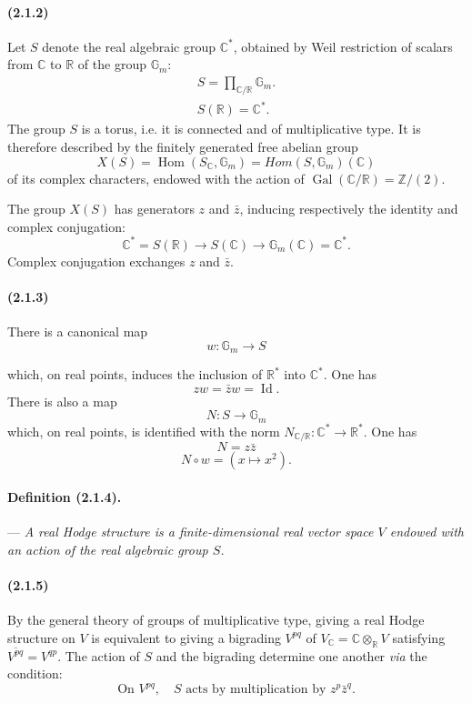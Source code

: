 \documentclass[10pt]{article}
\newcommand{\C}{\mathbb C}
\newcommand{\Z}{\mathbb Z}
\newcommand{\Hom}{\operatorname{Hom}}
\newcommand{\R}{\mathbb R}
\newcommand{\Gm}{\mathbb G_m}
\newcommand{\Gal}{\operatorname{Gal}}
\begin{document}
\paragraph{(2.1.2)} Let $S$ denote the real algebraic group $\C^*$, obtained by Weil restriction of scalars from $\C$ to $\R$ of the group $\Gm$:
\[
\begin{gathered}
S=\prod_{\C/\R}\Gm.\\
S(\R)=\C^*.
\end{gathered}
\]
The group $S$ is a torus, i.e. it is connected and of multiplicative type. It is therefore described by the finitely generated free abelian group
\[
X(S)=\Hom(S_\C,\Gm)=\mathit{Hom}(S,\Gm)(\C)
\]
of its complex characters, endowed with the action of $\Gal(\C/\R)=\Z/(2)$.

The group $X(S)$ has generators $z$ and $\bar z$, inducing respectively the identity and complex conjugation:
\[
\C^*=S(\R)\longrightarrow S(\C)\longrightarrow \Gm(\C)=\C^*.
\]
Complex conjugation exchanges $z$ and $\bar z$.

\paragraph{(2.1.3)} There is a canonical map
\[
\tag{2.1.3.1}
w:\Gm\longrightarrow S
\]




which, on real points, induces the inclusion of $\R^*$ into $\C^*$. One has
\[
\tag{2.1.3.2}
z w=\bar z w=\operatorname{Id}.
\]
There is also a map
\[
\tag{2.1.3.3}
N:S\longrightarrow\Gm
\]
which, on real points, is identified with the norm $N_{\C/\R}:\C^*\to\R^*$. One has
\[
\tag{2.1.3.4}
N=z\bar z
\]
\[
\tag{2.1.3.5}
N\circ w=(x\mapsto x^2).
\]

\paragraph{Definition (2.1.4).} --- \emph{A real Hodge structure is a finite-dimensional real vector space $V$ endowed with an action of the real algebraic group $S$.}

\paragraph{(2.1.5)} By the general theory of groups of multiplicative type, giving a real Hodge structure on $V$ is equivalent to giving a bigrading $V^{pq}$ of $V_\C=\C\otimes_\R V$ satisfying $\overline{V^{pq}}=V^{qp}$. The action of $S$ and the bigrading determine one another \emph{via} the condition:
\[
\tag{2.1.5.1}
\text{On }V^{pq},\quad S\text{ acts by multiplication by }z^p\bar z^q.
\]
\end{document}
